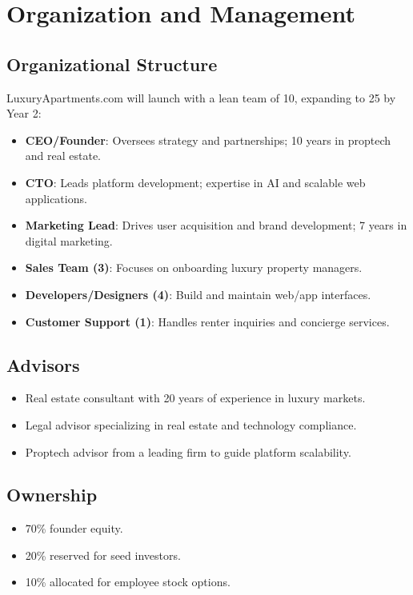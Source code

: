 \documentclass[12pt]{article}
\begin{document}
\section{Organization and Management}
\subsection{Organizational Structure}
LuxuryApartments.com will launch with a lean team of 10, expanding to 25 by Year 2:
\begin{itemize}
    \item \textbf{CEO/Founder}: Oversees strategy and partnerships; 10 years in proptech and real estate.
    \item \textbf{CTO}: Leads platform development; expertise in AI and scalable web applications.
    \item \textbf{Marketing Lead}: Drives user acquisition and brand development; 7 years in digital marketing.
    \item \textbf{Sales Team (3)}: Focuses on onboarding luxury property managers.
    \item \textbf{Developers/Designers (4)}: Build and maintain web/app interfaces.
    \item \textbf{Customer Support (1)}: Handles renter inquiries and concierge services.
\end{itemize}

\subsection{Advisors}
\begin{itemize}
    \item Real estate consultant with 20 years of experience in luxury markets.
    \item Legal advisor specializing in real estate and technology compliance.
    \item Proptech advisor from a leading firm to guide platform scalability.
\end{itemize}

\subsection{Ownership}
\begin{itemize}
    \item 70\% founder equity.
    \item 20\% reserved for seed investors.
    \item 10\% allocated for employee stock options.
\end{itemize}
\end{document}
